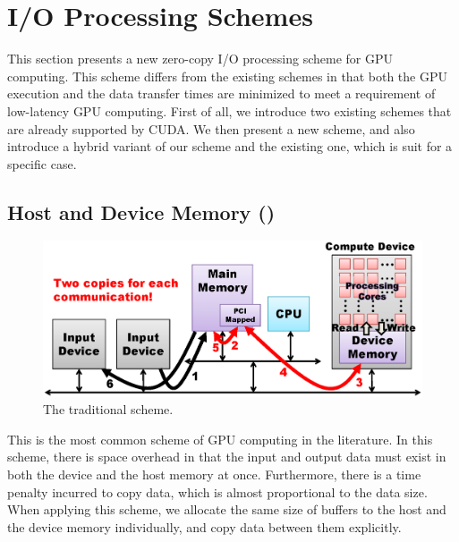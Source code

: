 \section{I/O Processing Schemes}
\label{sec:io_processing}

This section presents a new zero-copy I/O processing scheme for GPU
computing. 
This scheme differs from the existing schemes in that both the GPU
execution and the data transfer times are minimized to meet a
requirement of low-latency GPU computing.
First of all, we introduce two existing schemes that are already
supported by CUDA.
We then present a new scheme, and also introduce a hybrid variant of our 
scheme and the existing one, which is suit for a specific case.

\subsection{Host and Device Memory ({\hd})}
\label{sec:hd}

\begin{figure}[!t]
 \centering
 \includegraphics[width=\hsize]{eps/hd.eps}
 \caption{The traditional {\hd} scheme.}
 \label{fig:hd}
\end{figure}

This is the most common scheme of GPU computing in the literature.
In this scheme, there is space overhead in that the input and output
data must exist in both the device and the host memory at once.
Furthermore, there is a time penalty incurred to copy data, which is
almost proportional to the data size.
When applying this scheme, we allocate the same size of buffers to the
host and the device memory individually, and copy data between them
explicitly.

